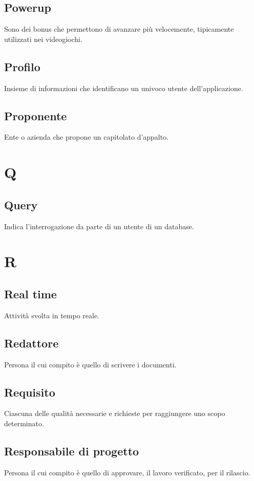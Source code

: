 \subsection*{Powerup}
Sono dei bonus che permettono di avanzare più velocemente, tipicamente utilizzati nei videogiochi.

\subsection*{Profilo}
Insieme di informazioni che identificano un univoco utente dell'applicazione.

\subsection*{Proponente}
Ente o azienda che propone un capitolato d'appalto.

\newpage
\section{Q}
\subsection*{Query}
Indica l'interrogazione da parte di un utente di un database.

\newpage
\section{R}
\subsection*{Real time}
Attività svolta in tempo reale.

\subsection*{Redattore}
Persona il cui compito è quello di scrivere i documenti.

\subsection*{Requisito}
Ciascuna delle qualità necessarie e richieste per raggiungere uno scopo determinato.

\subsection*{Responsabile di progetto}
Persona il cui compito è quello di approvare, il lavoro verificato, per il rilascio.

